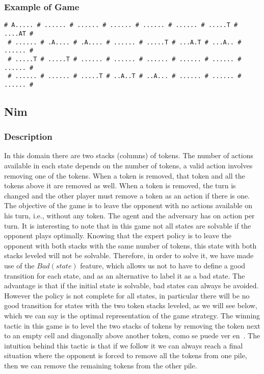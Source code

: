 \documentclass[a4paper]{article}
\begin{document}
\subsubsection{Example of Game}
\begin{Verbatim}[fontsize=\footnotesize]
 # A..... # ...... # ...... # ...... # ...... # ...... # .....T # ....AT #
 # ...... # .A.... # .A.... # ...... # .....T # ...A.T # ...A.. # ...... #
 # .....T # .....T # ...... # ...... # ...... # ...... # ...... # ...... #
 # ...... # ...... # .....T # ..A..T # ..A... # ...... # ...... # ...... #
\end{Verbatim}

\subsection{Nim}
\subsubsection{Description}
In this domain there are two stacks (columns) of tokens. The number of actions available in each state depends on the number of tokens, a valid action involves removing one of the tokens. When a token is removed, that token and all the tokens above it are removed as well. When a token is removed, the turn is changed and the other player must remove a token as an action if there is one. The objective of the game is to leave the opponent with no actions available on his turn, i.e., without any token. The agent and the adversary has on action per turn.
It is interesting to note that in this game not all states are solvable if the opponent plays optimally. Knowing that the expert policy is to leave the opponent with both stacks with the same number of tokens, this state with both stacks leveled will not be solvable. Therefore, in order to solve it, we have made use of the $Bad(state)$ feature, which allows us not to have to define a good transition for each state, and as an alternative to label it as a bad state. The advantage is that if the initial state is solvable, bad states can always be avoided. However the policy is not complete for all states, in particular there will be no good transition for states with the two token stacks leveled, as we will see below, which we can say is the optimal representation of the game strategy. The winning tactic in this game is to level the two stacks of tokens by removing the token next to an empty cell and diagonally above another token, como se puede ver en~\cite{silver2020few}. The intuition behind this tactic is that if we follow it we can always reach a final situation where the opponent is forced to remove all the tokens from one pile, then we can remove the remaining tokens from the other pile.
\end{document}
